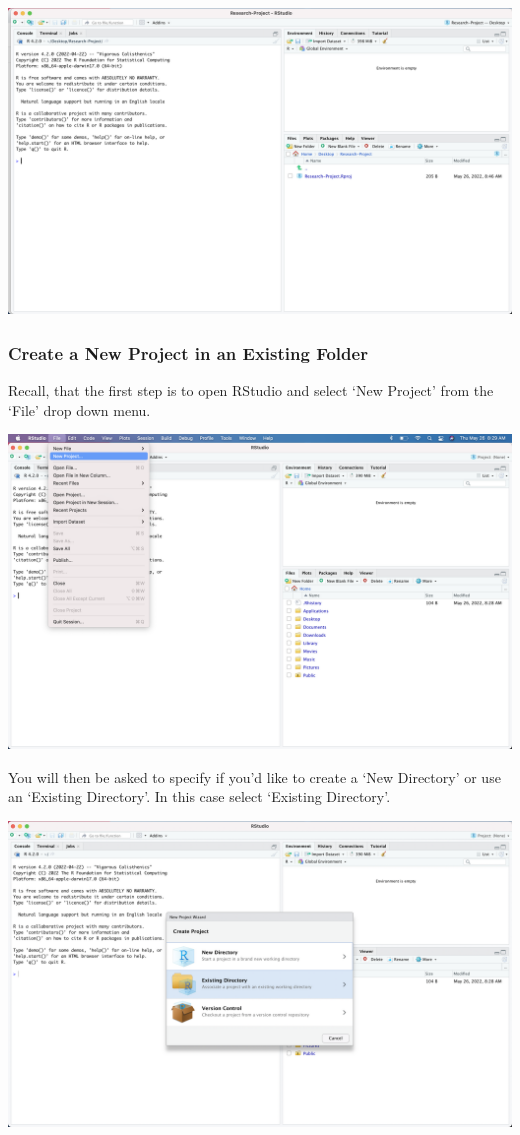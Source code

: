 \documentclass[
]{book}
\begin{document}
\includegraphics{images/D_new-project-in-new-folder-6.png}

\hypertarget{create-a-new-project-in-an-existing-folder}{%
\subsubsection{Create a New Project in an Existing Folder}\label{create-a-new-project-in-an-existing-folder}}

Recall, that the first step is to open RStudio and select `New Project' from the `File' drop down menu.

\includegraphics{images/D_new-project-1.png}

You will then be asked to specify if you'd like to create a `New Directory' or use an `Existing Directory'. In this case select `Existing Directory'.

\includegraphics{images/D_new-project-old-folder-2.png}
\end{document}

